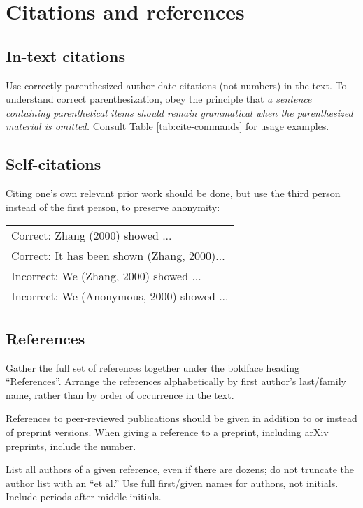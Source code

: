 \documentclass[11pt,a4paper]{article}
\newcommand{\ex}[1]{{\sf #1}}
\begin{document}
\section{Citations and references}
\label{sec:cite}


\subsection{In-text citations}
\label{sec:in-text-cite}
Use correctly parenthesized author-date citations
(not numbers) in the text. To understand correct parenthesization, obey the
principle that \emph{a sentence containing parenthetical items should remain
grammatical when the parenthesized material is omitted.} Consult Table
\ref{tab:cite-commands} for usage examples.


\iftaclpubformat
\else
\subsection{Self-citations}
\label{sec:self-cite}

Citing one's own relevant prior work should be done,  but use the third
person instead of the first person, to preserve anonymity:
\begin{tabular}{l}
Correct: \ex{Zhang (2000) showed ...} \\
Correct: \ex{It has been shown (Zhang, 2000)...} \\
Incorrect: \ex{We (Zhang, 2000) showed ...} \\
Incorrect: \ex{We (Anonymous, 2000) showed ...}
\end{tabular}
\fi

\subsection{References}
\label{sec:references}
Gather the full set of references together under
the boldface heading ``References''. Arrange the references alphabetically
by first author's last/family name, rather than by order of occurrence in the
text.

References to peer-reviewed publications should be given in addition to or
instead of preprint versions. When giving a reference to a preprint, including
arXiv preprints, include the number.

List all authors of a given reference, even if there are dozens; do not
truncate the author list with an ``et al.''  Use full first/given names for
authors, not initials.  Include periods after middle initials.
\end{document}
